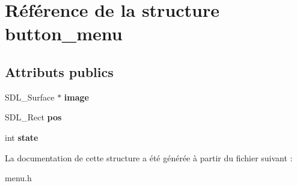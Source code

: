 \hypertarget{structbutton__menu}{}\section{Référence de la structure button\+\_\+menu}
\label{structbutton__menu}
\subsection*{Attributs publics}
\begin{DoxyCompactItemize}
\item 
\mbox{\label{structbutton__menu_a7ad66410dade1ecaa4e65c0326c0d624}} 
S\+D\+L\+\_\+\+Surface $\ast$ {\bfseries image}
\item 
\mbox{\label{structbutton__menu_a36367b8751a348ab63653cfc2c9e7ab0}} 
S\+D\+L\+\_\+\+Rect {\bfseries pos}
\item 
\mbox{\label{structbutton__menu_ac678b43de43c3ec8677c301e9c98061d}} 
int {\bfseries state}
\end{DoxyCompactItemize}


La documentation de cette structure a été générée à partir du fichier suivant \+:\begin{DoxyCompactItemize}
\item 
menu.\+h\end{DoxyCompactItemize}
